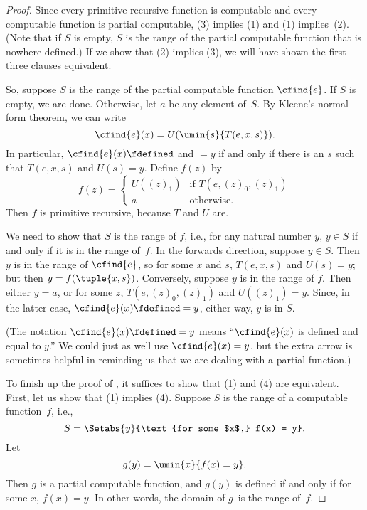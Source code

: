 \documentclass[../../../include/open-logic-section]{subfiles}
\begin{document}
\begin{proof}
Since every primitive recursive function is computable and every
computable function is partial computable, (3) implies (1) and (1)
implies~(2). (Note that if $S$ is empty, $S$ is the range of the
partial computable function that is nowhere defined.) If we show that
(2) implies (3), we will have shown the first three clauses
equivalent.

So, suppose $S$ is the range of the partial computable function
$\cfind{e}$. If $S$ is empty, we are done. Otherwise, let $a$ be any
element of~$S$. By Kleene's normal form theorem, we can write
\[
\cfind{e}(x) = U (\umin{s}{T(e, x, s)}).
\]
In particular, $\cfind{e}(x) \fdefined$ and $= y$ if and only if there
is an $s$ such that $T(e, x, s)$ and $U(s) = y$. Define $f(z)$ by
\[
f(z) = \begin{cases}
U((z)_1) & \text{if $T(e, (z)_0, (z)_1)$} \\
a        & \text{otherwise.}
\end{cases}
\]
Then $f$ is primitive recursive, because $T$ and $U$
are. 

We need to show that $S$ is the range of $f$, i.e., for any natural
number $y$, $y \in S$ if and only if it is in the range of~$f$. In the
forwards direction, suppose $y \in S$. Then $y$ is in the range of
$\cfind{e}$, so for some $x$ and $s$, $T(e,x,s)$ and $U(s) = y$; but then
$y = f(\tuple{x,s})$. Conversely, suppose $y$ is in the range of
$f$. Then either $y = a$, or for some $z$, $T(e,(z)_0,(z)_1)$ and
$U((z)_1) = y$. Since, in the latter case, $\cfind{e}(x) \fdefined = y$,
either way, $y$ is in $S$.

(The notation $\cfind{e}(x) \fdefined = y$ means ``$\cfind{e}(x)$ is
defined and equal to $y$.'' We could just as well use $\cfind{e}(x) =
y$, but the extra arrow is sometimes helpful in reminding us that we
are dealing with a partial function.)

To finish up the proof of , it suffices to show
that (1) and (4) are equivalent. First, let us show that (1) implies
(4). Suppose $S$ is the range of a computable function~$f$, i.e.,
\[
S = \Setabs{y}{\text{for some $x$,} f(x) = y}.
\]
Let
\[
g(y) = \umin{x}{f(x) = y}.
\]
Then $g$ is a partial computable function, and $g(y)$ is defined if
and only if for some $x$, $f(x) = y$. In other words, the domain of
$g$~is the range of~$f$. 


\end{proof}
\end{document}
